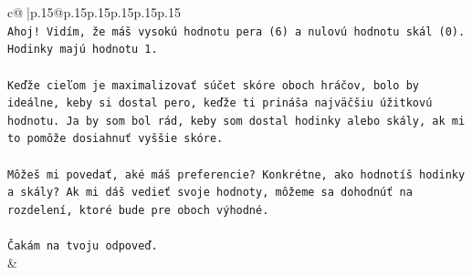 \documentclass{article}
\begin{document}
{\begin{supertabular}{c@{$\;$}|p{.15\linewidth}@{}p{.15\linewidth}p{.15\linewidth}p{.15\linewidth}p{.15\linewidth}p{.15\linewidth}}
{{{\\ 
\texttt{Ahoj! Vidím, že máš vysokú hodnotu pera (6) a nulovú hodnotu skál (0). Hodinky majú hodnotu 1.} \\
\\ 
\texttt{Keďže cieľom je maximalizovať súčet skóre oboch hráčov, bolo by ideálne, keby si dostal pero, keďže ti prináša najväčšiu úžitkovú hodnotu. Ja by som bol rád, keby som dostal hodinky alebo skály, ak mi to pomôže dosiahnuť vyššie skóre.} \\
\\ 
\texttt{Môžeš mi povedať, aké máš preferencie? Konkrétne, ako hodnotíš hodinky a skály? Ak mi dáš vedieť svoje hodnoty, môžeme sa dohodnúť na rozdelení, ktoré bude pre oboch výhodné.} \\
\\ 
\texttt{Čakám na tvoju odpoveď.} \\
            }
        }
    }
    & \\ \\


\end{supertabular}}
\end{document}
